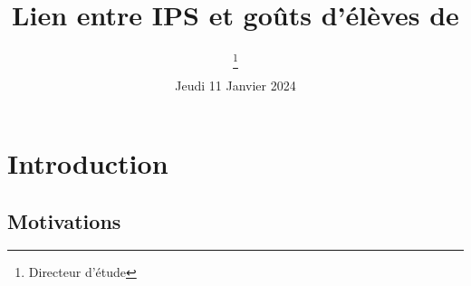 \documentclass[a4paper, 11pt]{article}
\begin{document}
\title{Lien entre IPS et goûts d'élèves de}
\author{
   \and
   \and
    \thanks{Directeur d'étude}
} 
\date{Jeudi 11 Janvier 2024} 

\maketitle

\tableofcontents

\newpage

\section{Introduction}
\subsection{Motivations}
\end{document}
